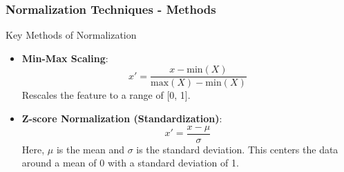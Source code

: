 \documentclass[aspectratio=169]{beamer}
\begin{document}
\begin{frame}[fragile]
    \frametitle{Normalization Techniques - Methods}
    \begin{block}{Key Methods of Normalization}
        \begin{itemize}
            \item \textbf{Min-Max Scaling}:
                \begin{equation}
                x' = \frac{x - \text{min}(X)}{\text{max}(X) - \text{min}(X)}
                \end{equation}
                Rescales the feature to a range of [0, 1].
                
            \item \textbf{Z-score Normalization (Standardization)}:
                \begin{equation}
                x' = \frac{x - \mu}{\sigma}
                \end{equation}
                Here, $\mu$ is the mean and $\sigma$ is the standard deviation. This centers the data around a mean of 0 with a standard deviation of 1.
        \end{itemize}
    \end{block}
\end{frame}
\end{document}
